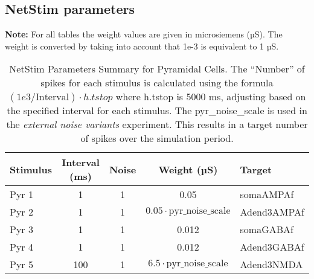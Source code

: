 \subsection{NetStim parameters}
\textbf{Note:} For all tables the weight values are given in microsiemens (µS).
The weight is converted by taking into account that 1e-3 is equivalent to 1 µS.
\begin{table}[htbp]
    \centering
    \caption[NetStim Parameters Pyramidal cells]{NetStim Parameters Summary for Pyramidal Cells.
        The ``Number'' of spikes for each stimulus is calculated using the formula \((1e3 / \text{Interval}) \cdot h.tstop\) where h.tstop is 5000 ms,
        adjusting based on the specified interval for each stimulus.
        The pyr\_noise\_scale is used in the \textit{external noise variants} experiment.
        This results in a target number of spikes over the simulation period.}\label{table:netstimparams_pyr}
    \begin{tabular}{lcccl}
        \hline
        \textbf{Stimulus} & \textbf{Interval (ms)} & \textbf{Noise} & \textbf{Weight (µS)}                    & \textbf{Target} \\
        \hline
        Pyr 1             & 1                      & 1              & 0.05                                    & somaAMPAf       \\
        Pyr 2             & 1                      & 1              & \(0.05 \cdot \text{pyr\_noise\_scale}\) & Adend3AMPAf     \\
        Pyr 3             & 1                      & 1              & 0.012                                   & somaGABAf       \\
        Pyr 4             & 1                      & 1              & 0.012                                   & Adend3GABAf     \\
        Pyr 5             & 100                    & 1              & \(6.5 \cdot \text{pyr\_noise\_scale}\)  & Adend3NMDA      \\ \hline
    \end{tabular}
\end{table}

